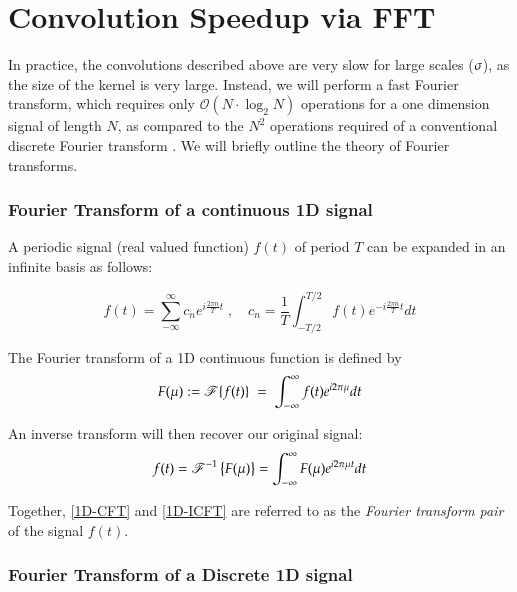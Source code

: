 \section{Convolution Speedup via FFT}

In practice, the convolutions described above  are very slow for large scales ($\large \sigma$), as the size of the kernel is very large. Instead, we will perform a fast Fourier transform, which requires only $\mathscr{O}\left(N\cdot \log_2N\right)$ operations for a one dimension signal of length $N$, as compared to the $N^2$ operations required of a conventional discrete Fourier transform \cite{DIPGW}. We will briefly outline the theory of Fourier transforms.

\subsubsection{Fourier Transform of a continuous 1D signal}


A periodic signal (real valued function) $f(t)$ of period $T$ can  be expanded in an infinite basis as follows:

\begin{equation}
f(t) = \sum_{-\infty}^{\infty} c_n e^{i\frac{2\pi n}{T}t} \;,\quad
	c_n = \frac{1}{T}\int_{-T/2}^{T/2} f(t) e^{-i\frac{2\pi n}{T}t} dt
	\end{equation}

The Fourier transform of a 1D continuous function is defined by
\begin{equation} \label{1D-CFT}
F(\mu) := \operatorname{\mathscr{F}}\{f(t)\} \;=\; \int_{-\infty}^{\infty} f(t) e^{i2\pi \mu } dt
\end{equation}

An inverse transform will then recover our original signal:
\begin{equation} \label{1D-ICFT}
f(t) = \operatorname{\mathscr{F}}^{-1}\left\{F(\mu)\right\} = \int_{-\infty}^{\infty} F(\mu) e^{i2\pi \mu t} dt
\end{equation}

Together, \cref{1D-CFT} and \cref{1D-ICFT} are referred to as the \textit{Fourier transform pair} of the signal $f(t)$. 

\subsubsection{Fourier Transform of a Discrete 1D signal}

